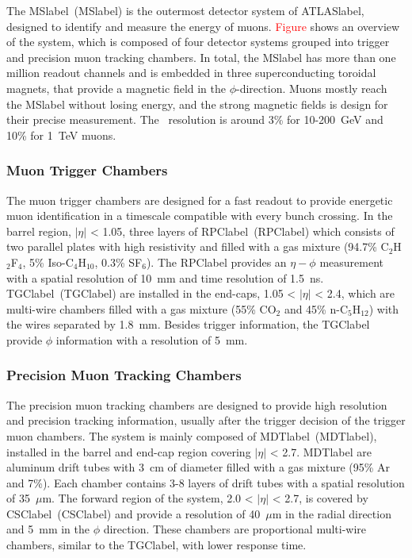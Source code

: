 The \acrlong{MSlabel}~(\acrshort{MSlabel}) is the outermost detector system of \acrshort{ATLASlabel}, designed to identify and measure the energy of muons. \textcolor{red}{Figure} shows an overview of the system, which is composed of four detector systems grouped into trigger and precision muon tracking chambers. In total, the \acrshort{MSlabel} has more than one million readout channels and is embedded in three superconducting toroidal magnets, that provide a magnetic field in the $\phi$-direction. Muons mostly reach the \acrshort{MSlabel} without losing energy, and the strong magnetic fields is design for their precise measurement. The \pT\ resolution is around 3\% for 10-200~GeV and 10\% for 1~TeV muons. 


\subsubsection*{Muon Trigger Chambers}

The muon trigger chambers are designed for a fast readout to provide energetic muon identification in a timescale compatible with every bunch crossing. In the barrel region, $|\eta|$ < 1.05, three layers of \acrlong{RPClabel}~(\acrshort{RPClabel}) which consists of two parallel plates with high resistivity and filled with a gas mixture (94.7\% C$_2$H$_2$F$_4$, 5\% Iso-C$_4$H$_{10}$, 0.3\% SF$_6$). The \acrshort{RPClabel} provides an $\eta-\phi$ measurement with a spatial resolution of 10~mm and time resolution of 1.5~ns. \acrlong{TGClabel}~(\acrshort{TGClabel}) are installed in the end-caps, 1.05 < $|\eta|$ < 2.4, which are multi-wire chambers filled with a gas mixture (55\% CO$_2$ and 45\% n-C$_5$H$_{12}$) with the wires separated by 1.8~mm. Besides trigger information, the \acrshort{TGClabel} provide $\phi$ information with a resolution of 5~mm.

\subsubsection*{Precision Muon Tracking Chambers}

The precision muon tracking chambers are designed to provide high resolution and precision tracking information, usually after the trigger decision of the trigger muon chambers. The system is mainly composed of \acrlong{MDTlabel}~(\acrshort{MDTlabel}), installed in the barrel and end-cap region covering $|\eta|$ < 2.7. \acrshort{MDTlabel} are aluminum drift tubes with 3~cm of diameter filled with a gas mixture (95\% Ar and 7\%). Each chamber contains 3-8 layers of drift tubes with a spatial resolution of 35~$\mu$m. The forward region of the system, 2.0 < $|\eta|$ < 2.7, is covered by \acrlong{CSClabel}~(\acrshort{CSClabel}) and provide a resolution of 40~$\mu$m in the radial direction and 5~mm in the $\phi$ direction. These chambers are proportional multi-wire chambers, similar to the \acrshort{TGClabel}, with lower response time.

